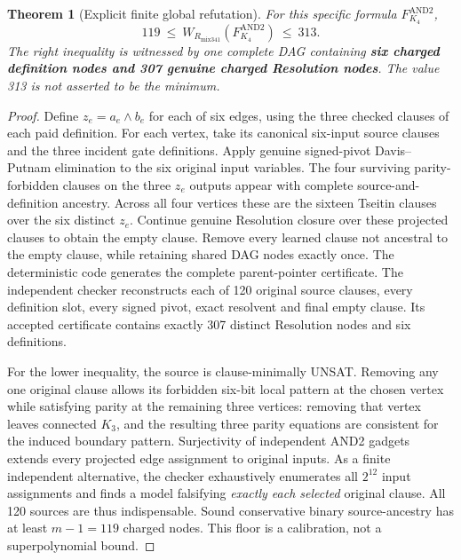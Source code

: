 \documentclass[11pt]{article}
\newtheorem{theorem}{Theorem}
\begin{document}
\begin{theorem}[Explicit finite global refutation]
For this specific formula $F^{\mathrm{AND2}}_{K_4}$,
\[
119\ \le\ W_{R_{\mathrm{mix341}}}(F^{\mathrm{AND2}}_{K_4})\ \le\ 313.
\]
The right inequality is witnessed by one complete DAG containing \textbf{six charged definition nodes and 307 genuine charged Resolution nodes}. The value 313 is not asserted to be the minimum.
\end{theorem}
\begin{proof}
Define $z_e=a_e\wedge b_e$ for each of six edges, using the three checked clauses of each paid definition. For each vertex, take its canonical six-input source clauses and the three incident gate definitions. Apply genuine signed-pivot Davis--Putnam elimination to the six original input variables. The four surviving parity-forbidden clauses on the three $z_e$ outputs appear with complete source-and-definition ancestry. Across all four vertices these are the sixteen Tseitin clauses over the six distinct $z_e$. Continue genuine Resolution closure over these projected clauses to obtain the empty clause. Remove every learned clause not ancestral to the empty clause, while retaining shared DAG nodes exactly once. The deterministic code generates the complete parent-pointer certificate. The independent checker reconstructs each of 120 original source clauses, every definition slot, every signed pivot, exact resolvent and final empty clause. Its accepted certificate contains exactly 307 distinct Resolution nodes and six definitions.

For the lower inequality, the source is clause-minimally UNSAT. Removing any one original clause allows its forbidden six-bit local pattern at the chosen vertex while satisfying parity at the remaining three vertices: removing that vertex leaves connected $K_3$, and the resulting three parity equations are consistent for the induced boundary pattern. Surjectivity of independent AND2 gadgets extends every projected edge assignment to original inputs. As a finite independent alternative, the checker exhaustively enumerates all $2^{12}$ input assignments and finds a model falsifying \emph{exactly each selected} original clause. All 120 sources are thus indispensable. Sound conservative binary source-ancestry has at least $m-1=119$ charged nodes. This floor is a calibration, not a superpolynomial bound.
\end{proof}
\end{document}
